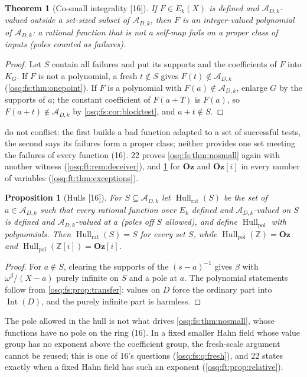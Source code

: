 \documentclass[11pt,letterpaper]{article}
\numberwithin{equation}{section}
\newtheorem{theorem}{Theorem}[section]
\newtheorem{proposition}[proposition]{Proposition}
\theoremstyle{definition}
\theoremstyle{remark}
\theoremstyle{plain}
\newcommand{\Oz}{\mathbf{Oz}}
\newcommand{\GOz}{\Oz[i]}
\newcommand{\Z}{\mathbb Z}
\newcommand{\A}{\mathcal A}          %
\newcommand{\Int}{\operatorname{Int}}
\newcommand{\src}[1]{\textup{\textsf{[#1]}}}
\begin{document}
\begin{theorem}[Co-small integrality \src{16}]\label{osq:fs:thm:cosmall}
If $F\in E_k(X)$ is defined and $\A_{D,k}$-valued outside a set-sized subset of $\A_{D,k}$, then $F$ is an integer-valued polynomial of
$\A_{D,k}$: a rational function that is not a self-map fails on a proper class of inputs (poles counted as failures).
\end{theorem}
\begin{proof}
Let $S$ contain all failures and put its supports and the coefficients of $F$ into $K_G$. If $F$ is not a polynomial, a fresh $t\notin S$
gives $F(t)\notin\A_{D,k}$ (\cref{osq:fs:thm:onepoint}). If $F$ is a polynomial with $F(a)\notin\A_{D,k}$, enlarge $G$ by the supports of $a$;
the constant coefficient of $F(a+T)$ is $F(a)$, so $F(a+t)\notin\A_{D,k}$ by \cref{osq:fs:cor:blocktest}, and $a+t\notin S$.
\end{proof}

 do not conflict: the first builds a bad function adapted to a set of successful tests, the second
says its failures form a proper class; neither provides one set meeting the failures of every function (16). 22 proves
\cref{osq:fs:thm:nosmall} again with another witness (\cref{osq:ft:rem:deceiver}), and \cref{osq:fs:thm:cosmall} for $\Oz$ and $\GOz$ in every
number of variables (\cref{osq:ft:thm:exceptions}).

\begin{proposition}[Hulls \src{16}]\label{osq:fs:prop:hulls}
For $S\subseteq\A_{D,k}$ let $\operatorname{Hull}_{\mathrm{rat}}(S)$ be the set of $a\in\A_{D,k}$ such that every rational function over $E_k$
defined and $\A_{D,k}$-valued on $S$ is defined and $\A_{D,k}$-valued at $a$ (poles off $S$ allowed), and define
$\operatorname{Hull}_{\mathrm{pol}}$ with polynomials. Then $\operatorname{Hull}_{\mathrm{rat}}(S)=S$ for every set $S$, while
$\operatorname{Hull}_{\mathrm{pol}}(\Z)=\Oz$ and $\operatorname{Hull}_{\mathrm{pol}}(\Z[i])=\GOz$.
\end{proposition}
\begin{proof}
For $a\notin S$, clearing the supports of the $(s-a)^{-1}$ gives $\beta$ with $\omega^\beta/(X-a)$ purely infinite on $S$ and a pole at $a$.
The polynomial statements follow from \cref{osq:fs:prop:transfer}: values on $D$ force the ordinary part into $\Int(D)$, and the purely infinite
part is harmless.
\end{proof}

The pole allowed in the hull is not what drives \cref{osq:fs:thm:nosmall}, whose functions have no pole on the ring (16). In a fixed smaller Hahn
field whose value group has no exponent above the coefficient group, the fresh-scale argument cannot be reused; this is one of 16's questions
(\cref{osq:fs:q:fresh}), and 22 states exactly when a fixed Hahn field has such an exponent (\cref{osq:ft:prop:relative}).
\end{document}
